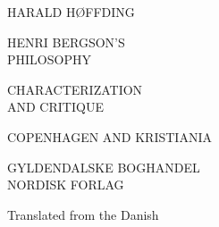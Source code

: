 \documentclass[12pt,a4paper,openany]{book}
\begin{document}
\frontmatter
\pagestyle{empty}
\begin{titlepage}
\centering
{\large HARALD HØFFDING}\par
\vspace{2cm}
{\LARGE HENRI BERGSON'S\\[4pt] PHILOSOPHY}\par
\vspace{1cm}
{\large CHARACTERIZATION\\ AND CRITIQUE}\par
\vfill
{\small COPENHAGEN AND KRISTIANIA}\par
\medskip
{GYLDENDALSKE BOGHANDEL\\ NORDISK FORLAG}\par
{}\par
\vspace{2cm}
{\small Translated from the Danish}\par
\end{titlepage}
\end{document}
